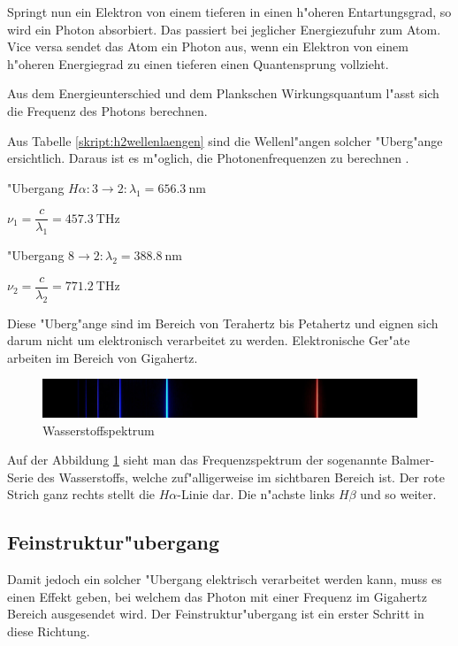 \begin{refsection}
Springt nun ein Elektron von einem tieferen in einen h"oheren
Entartungsgrad, so wird ein Photon absorbiert.  Das passiert bei
jeglicher Energiezufuhr zum Atom.  Vice versa sendet das Atom ein
Photon aus, wenn ein Elektron von einem h"oheren Energiegrad zu einen
tieferen einen Quantensprung vollzieht.

Aus dem Energieunterschied und dem Plankschen Wirkungsquantum l"asst
sich die Frequenz des Photons
berechnen. %

Aus Tabelle \ref{skript:h2wellenlaengen} sind die Wellenl"angen
solcher "Uberg"ange ersichtlich. Daraus ist es m"oglich, die
Photonenfrequenzen zu berechnen \cite{Gerthsen}.
\begin{center}
	"Ubergang $H\alpha: 3 \rightarrow 2: \lambda_1 = \SI{656.3}{\nano\meter}$

$\nu_1 = \dfrac{c}{\lambda_1} = \SI{457.3}{\tera\hertz}$
\vspace{.5cm}

"Ubergang $8 \rightarrow 2: \lambda_2 = \SI{388.8}{\nano\meter}$

$\nu_2 = \dfrac{c}{\lambda_2} = \SI{771.2}{\tera\hertz}$
\end{center}	

Diese "Uberg"ange sind im Bereich von Terahertz bis Petahertz und
eignen sich darum nicht um elektronisch verarbeitet zu
werden. Elektronische Ger"ate arbeiten im Bereich von Gigahertz.

\begin{figure}
	\centering
	\includegraphics[width = .6\columnwidth]{atomuhr/wasserstoffSpektrum.jpg}
	\caption{Wasserstoffspektrum \cite{pic:wasserstoffspektrum}} 
	\label{atomuhr:wasserstoffspektrum}
\end{figure}

Auf der Abbildung \ref{atomuhr:wasserstoffspektrum} sieht man das
Frequenzspektrum der sogenannte Balmer-Serie des Wasserstoffs, welche
zuf"alligerweise im sichtbaren Bereich ist. Der rote Strich ganz rechts
stellt die $H\alpha$-Linie dar. Die n"achste links $H\beta$ und so
weiter.


\subsection{Feinstruktur"ubergang}
Damit jedoch ein solcher "Ubergang elektrisch verarbeitet werden kann,
muss es einen Effekt geben, bei welchem das Photon mit einer Frequenz
im Gigahertz Bereich ausgesendet wird.  Der Feinstruktur"ubergang ist
ein erster Schritt in diese Richtung.


\end{refsection}
